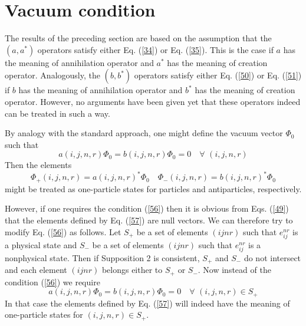 \documentclass[a4paper,12pt]{article}%
\begin{document}
\section{Vacuum condition}
\label{S7}

The results of the preceding section are based on the
assumption that the $(a,a^*)$ operators satisfy either
Eq. (\ref{34}) or Eq. (\ref{35}). This is the case if
$a$ has the meaning of annihilation operator and $a^*$
has the meaning of creation operator. Analogously, the
$(b,b^*)$ operators satisfy either Eq. (\ref{50}) or 
Eq. (\ref{51}) if $b$ has the meaning of annihilation 
operator and $b^*$ has the meaning of creation operator.
However, no arguments have been given yet that
these operators indeed can be treated in such a way. 

By analogy with the standard approach, one
might define the vacuum vector $\Phi_0$ such
that 
\begin{equation}
a(i,j,n,r)\Phi_0=b(i,j,n,r)\Phi_0=0\quad 
\forall\,\, (i,j,n,r) 
\label{56}
\end{equation}
Then the elements 
\begin{equation}
\Phi_+(i,j,n,r)=a(i,j,n,r)^*\Phi_0\quad
\Phi_-(i,j,n,r)=b(i,j,n,r)^*\Phi_0
\label{57}
\end{equation}
might be treated as one-particle states for particles 
and antiparticles, respectively. 

However, if one requires the condition (\ref{56})
then it is obvious from Eqs. (\ref{49})
that the elements defined by 
Eq. (\ref{57}) are null vectors. 
We can therefore try to modify
Eq. (\ref{56}) as follows. Let $S_+$ be a set 
of elements $(ijnr)$ such that $e^{nr}_{ij}$ is
a physical state and $S_-$ be a set 
of elements $(ijnr)$ such that $e^{nr}_{ij}$ is
a nonphysical state. Then if Supposition 2 is
consistent, $S_+$ and $S_-$ do not intersect
and each element $(ijnr)$ belongs either to
$S_+$ or $S_-$. Now instead of the condition 
(\ref{56}) we require 
\begin{equation}
a(i,j,n,r)\Phi_0=b(i,j,n,r)\Phi_0=0\quad 
\forall\,\, (i,j,n,r)\in S_+ 
\label{58}
\end{equation}
In that case the elements defined by Eq. (\ref{57}) 
will indeed have the meaning of one-particle states
for $(i,j,n,r)\in S_+$. 
\end{document}

